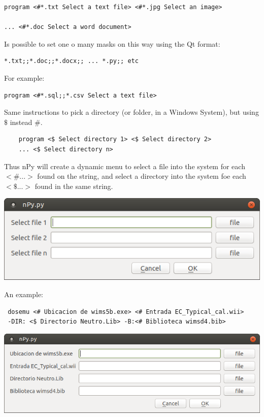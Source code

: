 \documentclass[a4paper,10pt]{article}
\begin{document}
\begin{verbatim}
program <#*.txt Select a text file> <#*.jpg Select an image> 

... <#*.doc Select a word document>
 \end{verbatim}

Is possible to set one o many masks on this way using the Qt format: 

\begin{verbatim}
*.txt;;*.doc;;*.docx;; ... *.py;; etc 
\end{verbatim}

For example: 
\begin{verbatim}
program <#*.sql;;*.csv Select a text file>
\end{verbatim}

Same instructions to pick a directory (or folder, in a Windows System), but using $\$$ instead $\#$.

 \begin{verbatim}
    program <$ Select directory 1> <$ Select directory 2> 
    ... <$ Select directory n>
\end{verbatim}

Thus nPy will create a dynamic menu to select a file into the system for each $<\# ...>$ found on the 
string, and select a directory into the system foe each $<\$ ...>$ found in the same string.

\begin{center}
 \includegraphics[width=\textwidth]{img/contextMenuExampleFile.png}
\end{center}

\noindent An example:

\begin{verbatim}
 dosemu <# Ubicacion de wims5b.exe> <# Entrada EC_Typical_cal.wii> 
 -DIR: <$ Directorio Neutro.Lib> -B:<# Biblioteca wimsd4.bib>
 \end{verbatim}

\begin{center}
 \includegraphics[width=\textwidth]{img/contextMenuFile.png}
\end{center}
\end{document}
